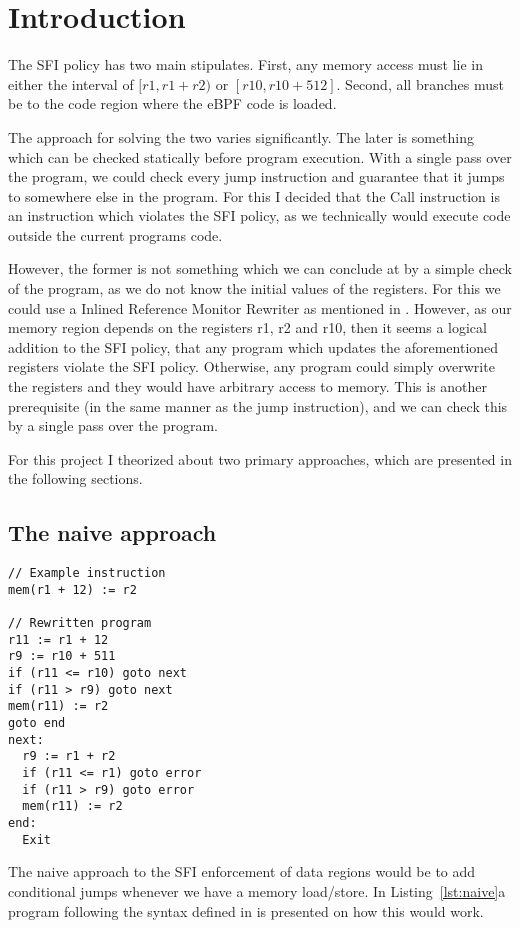 \section{Introduction}\label{sec:introduction}
The SFI policy has two main stipulates. First, any memory access must lie in
either the interval of $[r1, r1 + r2)$ or $[r10, r10+512]$. Second, all
branches must be to the code region where the eBPF code is loaded.

The approach for solving the two varies significantly. The later is something
which can be checked statically before program execution. With a single pass
over the program, we could check every jump instruction and guarantee that it
jumps to somewhere else in the program. For this I decided that the Call
instruction is an instruction which violates the SFI policy, as we technically
would execute code outside the current programs code. 

However, the former is not something which we can conclude at by a simple check
of the program, as we do not know the initial values of the registers. For this
we could use a Inlined Reference Monitor Rewriter as mentioned in \cite{SFI}.
However, as our memory region depends on the registers r1, r2 and r10, then it
seems a logical addition to the SFI policy, that any program which updates the
aforementioned registers violate the SFI policy. Otherwise, any program could
simply overwrite the registers and they would have arbitrary access to memory.
This is another prerequisite (in the same manner as the jump instruction), and
we can check this by a single pass over the program.

For this project I theorized about two primary approaches, which are presented in the following sections.

\subsection{The naive approach}
\begin{lstlisting}[caption={Example program}, label={lst:naive}]
// Example instruction
mem(r1 + 12) := r2

// Rewritten program
r11 := r1 + 12
r9 := r10 + 511
if (r11 <= r10) goto next
if (r11 > r9) goto next
mem(r11) := r2
goto end
next:
  r9 := r1 + r2
  if (r11 <= r1) goto error
  if (r11 > r9) goto error
  mem(r11) := r2
end:
  Exit
\end{lstlisting}
The naive approach to the SFI enforcement of data regions would be to add
conditional jumps whenever we have a memory load/store. In
Listing~\ref{lst:naive}a program following the syntax defined in \cite{SFI} is
presented on how this would work.

